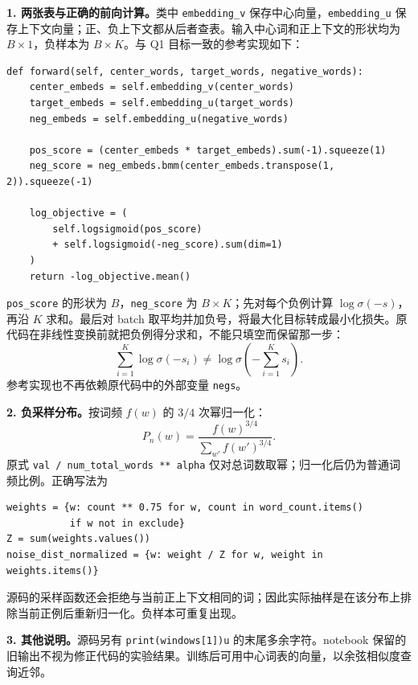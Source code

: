 \textbf{1. 两张表与正确的前向计算。}类中 \texttt{embedding\_v} 保存中心向量，\texttt{embedding\_u} 保存上下文向量；正、负上下文都从后者查表。输入中心词和正上下文的形状均为 $B\times1$，负样本为 $B\times K$。与 Q1 目标一致的参考实现如下：
\par
\begingroup\linespread{1}\fontsize{9}{11}\selectfont
\begin{verbatim}
def forward(self, center_words, target_words, negative_words):
    center_embeds = self.embedding_v(center_words)
    target_embeds = self.embedding_u(target_words)
    neg_embeds = self.embedding_u(negative_words)

    pos_score = (center_embeds * target_embeds).sum(-1).squeeze(1)
    neg_score = neg_embeds.bmm(center_embeds.transpose(1, 2)).squeeze(-1)

    log_objective = (
        self.logsigmoid(pos_score)
        + self.logsigmoid(-neg_score).sum(dim=1)
    )
    return -log_objective.mean()
\end{verbatim}
\endgroup
\texttt{pos\_score} 的形状为 $B$，\texttt{neg\_score} 为 $B\times K$；先对每个负例计算 $\log\sigma(-s)$，再沿 $K$ 求和。最后对 batch 取平均并加负号，将最大化目标转成最小化损失。原代码在非线性变换前就把负例得分求和，不能只填空而保留那一步：
\[
 \sum_{i=1}^{K}\log\sigma(-s_i)
 \neq\log\sigma\!\left(-\sum_{i=1}^{K}s_i\right).
\]
参考实现也不再依赖原代码中的外部变量 \texttt{negs}。

\textbf{2. 负采样分布。}按词频 $f(w)$ 的 $3/4$ 次幂归一化：
\[
 P_n(w)=\frac{f(w)^{3/4}}{\sum_{w'}f(w')^{3/4}}.
\]
原式 \texttt{val / num\_total\_words ** alpha} 仅对总词数取幂；归一化后仍为普通词频比例。正确写法为
\par
\begingroup\linespread{1}\fontsize{9}{11}\selectfont
\begin{verbatim}
weights = {w: count ** 0.75 for w, count in word_count.items()
           if w not in exclude}
Z = sum(weights.values())
noise_dist_normalized = {w: weight / Z for w, weight in weights.items()}
\end{verbatim}
\endgroup
源码的采样函数还会拒绝与当前正上下文相同的词；因此实际抽样是在该分布上排除当前正例后重新归一化。负样本可重复出现。

\textbf{3. 其他说明。}源码另有 \texttt{print(windows[1])u} 的末尾多余字符。notebook 保留的旧输出不视为修正代码的实验结果。训练后可用中心词表的向量，以余弦相似度查询近邻。
\endgroup
